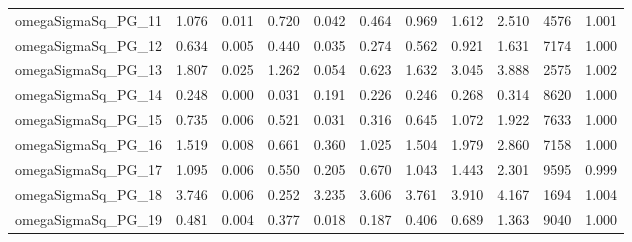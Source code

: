 \documentclass[12pt]{article}
\begin{document}
\begin{longtable}{lrrrrrrrrrr}
omegaSigmaSq\_PG\_11 & 1.076 & 0.011 & 0.720 & 0.042 & 0.464 & 0.969 & 1.612 & 2.510 &  4576 & 1.001 \\
omegaSigmaSq\_PG\_12 & 0.634 & 0.005 & 0.440 & 0.035 & 0.274 & 0.562 & 0.921 & 1.631 &  7174 & 1.000 \\
omegaSigmaSq\_PG\_13 & 1.807 & 0.025 & 1.262 & 0.054 & 0.623 & 1.632 & 3.045 & 3.888 &  2575 & 1.002 \\
omegaSigmaSq\_PG\_14 & 0.248 & 0.000 & 0.031 & 0.191 & 0.226 & 0.246 & 0.268 & 0.314 &  8620 & 1.000 \\
omegaSigmaSq\_PG\_15 & 0.735 & 0.006 & 0.521 & 0.031 & 0.316 & 0.645 & 1.072 & 1.922 &  7633 & 1.000 \\
omegaSigmaSq\_PG\_16 & 1.519 & 0.008 & 0.661 & 0.360 & 1.025 & 1.504 & 1.979 & 2.860 &  7158 & 1.000 \\
omegaSigmaSq\_PG\_17 & 1.095 & 0.006 & 0.550 & 0.205 & 0.670 & 1.043 & 1.443 & 2.301 &  9595 & 0.999 \\
omegaSigmaSq\_PG\_18 & 3.746 & 0.006 & 0.252 & 3.235 & 3.606 & 3.761 & 3.910 & 4.167 &  1694 & 1.004 \\
omegaSigmaSq\_PG\_19 & 0.481 & 0.004 & 0.377 & 0.018 & 0.187 & 0.406 & 0.689 & 1.363 &  9040 & 1.000 \\
\end{longtable}
\endgroup


\newpage
\end{document}
